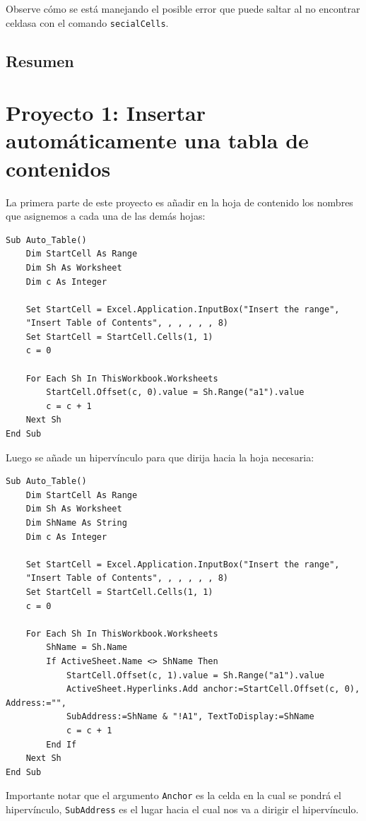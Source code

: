 Observe cómo se está manejando el posible error que puede saltar al no encontrar celdasa con el comando \texttt{secialCells}.


\subsection{Resumen}

\section{Proyecto 1: Insertar automáticamente una tabla de contenidos}

La primera parte de este proyecto es añadir en la hoja de contenido los nombres que asignemos a cada una de las demás hojas:

\begin{verbatim}
Sub Auto_Table()
    Dim StartCell As Range
    Dim Sh As Worksheet
    Dim c As Integer
    
    Set StartCell = Excel.Application.InputBox("Insert the range", 
    "Insert Table of Contents", , , , , , 8)
    Set StartCell = StartCell.Cells(1, 1)
    c = 0
    
    For Each Sh In ThisWorkbook.Worksheets
        StartCell.Offset(c, 0).value = Sh.Range("a1").value
        c = c + 1
    Next Sh
End Sub
\end{verbatim}

Luego se añade un hipervínculo para que dirija hacia la hoja necesaria:

\begin{verbatim}
Sub Auto_Table()
    Dim StartCell As Range
    Dim Sh As Worksheet
    Dim ShName As String
    Dim c As Integer
    
    Set StartCell = Excel.Application.InputBox("Insert the range", 
    "Insert Table of Contents", , , , , , 8)
    Set StartCell = StartCell.Cells(1, 1)
    c = 0
    
    For Each Sh In ThisWorkbook.Worksheets
        ShName = Sh.Name
        If ActiveSheet.Name <> ShName Then
            StartCell.Offset(c, 1).value = Sh.Range("a1").value
            ActiveSheet.Hyperlinks.Add anchor:=StartCell.Offset(c, 0), Address:="", 
            SubAddress:=ShName & "!A1", TextToDisplay:=ShName
            c = c + 1
        End If
    Next Sh
End Sub
\end{verbatim}


Importante notar que el argumento \texttt{Anchor} es la celda en la cual se pondrá el hipervínculo, \texttt{SubAddress} es el lugar hacia el cual nos va a dirigir el hipervínculo.\\

